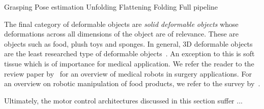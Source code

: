 \documentclass[\home/main.tex]{subfiles}
\begin{document}
    Grasping 
    Pose estimation
    Unfolding 
    Flattening 
    Folding 
    Full pipeline

The final category of deformable objects are \textit{solid deformable objects} whose deformations across all dimensions of the object are of relevance. These are objects such as food, plush toys and sponges. In general, 3D deformable objects are the least researched type of deformable objects~\autocite{Sanchez2018}. An exception to this is soft tissue which is of importance for medical application. We refer the reader to the review paper by~\textcite{Taylor2016} for an overview of medical robots in surgery applications. For an overview on robotic manipulation of food products, we refer to the survey by~\textcite{Chua2003}.


Ultimately, the motor control architectures discussed in this section suffer ...


\end{document}
